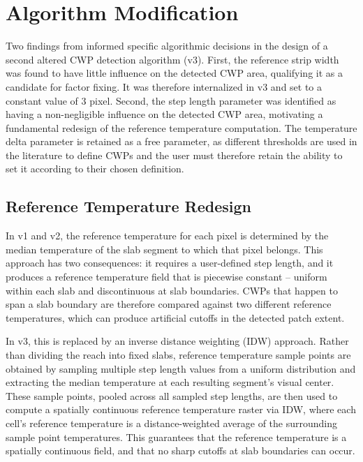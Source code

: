 \section{Algorithm Modification}
\label{sec:rq3_methods}

Two findings from \citet{tonolla_thermische-kartographie_2026} informed 
specific algorithmic decisions in the design of a second altered CWP detection algorithm (v3). First, the reference strip width was found to have little influence on the detected CWP area, qualifying 
it as a candidate for factor fixing. It was therefore internalized in v3 and 
set to a constant value of 3 pixel. Second, the step length parameter was identified 
as having a non-negligible influence on the detected CWP area, motivating a 
fundamental redesign of the reference temperature computation. The temperature 
delta parameter is retained as a free parameter, as different thresholds are 
used in the literature to define CWPs and the user must therefore retain the 
ability to set it according to their chosen definition.

\subsection{Reference Temperature Redesign}

In v1 and v2, the reference temperature for each pixel is determined by the 
median temperature of the slab segment to which that pixel belongs. This 
approach has two consequences: it requires a user-defined step length, and it 
produces a reference temperature field that is piecewise constant -- uniform 
within each slab and discontinuous at slab boundaries. CWPs that happen to 
span a slab boundary are therefore compared against two different reference 
temperatures, which can produce artificial cutoffs in the detected patch extent.

In v3, this is replaced by an inverse distance weighting (IDW) approach. Rather than dividing the reach into 
fixed slabs, reference temperature sample points are obtained by sampling 
multiple step length values from a uniform distribution and extracting the 
median temperature at each resulting segment's visual center. These sample 
points, pooled across all sampled step lengths, are then used to compute a 
spatially continuous reference temperature raster via IDW, where each cell's 
reference temperature is a distance-weighted average of the surrounding sample 
point temperatures. This guarantees that the reference temperature is a 
spatially continuous field, and that no sharp cutoffs at slab boundaries can 
occur.

